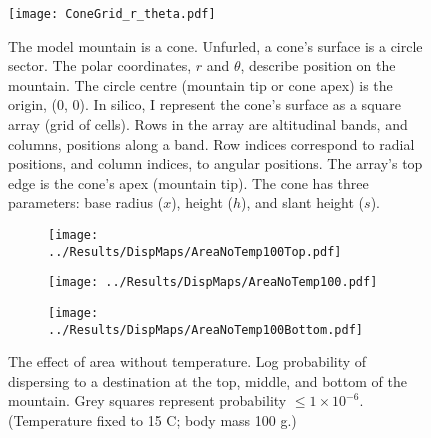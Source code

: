 \documentclass[11pt]{article}
\title{}
\author{}
\date{}
\begin{document}
\newpage
\begin{figure}

	\texttt{[image: ConeGrid\_r\_theta.pdf]}

	\caption{The model mountain is a cone. Unfurled, a cone's surface is a circle sector. The polar coordinates, $r$ and $\theta$, describe position on the mountain. The circle centre (mountain tip or cone apex) is the origin, (0, 0). In silico, I represent the cone's surface as a square array (grid of cells). Rows in the array are altitudinal bands, and columns, positions along a band. Row indices correspond to radial positions, and column indices, to angular positions. The array's top edge is the cone's apex (mountain tip). The cone has three parameters: base radius ($x$), height ($h$), and slant height ($s$).}

\end{figure}


\newpage
\begin{figure}
\vspace*{-4cm}

	\begin{subfigure}{\textwidth}
		\centering
		\texttt{[image: ../Results/DispMaps/AreaNoTemp100Top.pdf]}
		\caption{}
	\end{subfigure}%

	\begin{subfigure}{\textwidth}
		\centering
		\texttt{[image: ../Results/DispMaps/AreaNoTemp100.pdf]}
		\caption{}
	\end{subfigure}

	\begin{subfigure}{\textwidth}
		\centering
		\texttt{[image: ../Results/DispMaps/AreaNoTemp100Bottom.pdf]}
		\caption{}
	\end{subfigure}

	\caption{The effect of area without temperature. Log probability of dispersing to a destination at the top, middle, and bottom of the mountain. Grey squares represent probability $\leq 1 \times 10^{-6}$. (Temperature fixed to 15 \degree C; body mass 100 g.) }

\end{figure}
\end{document}
